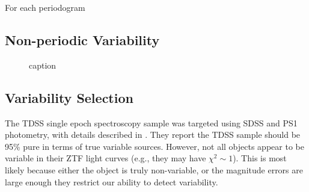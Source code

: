 \documentclass[twocolumn, tighten, astrosymb]{aastex631}
\begin{document}
For each periodogram



\subsection{Non-periodic Variability} \label{subsec:aperiodic}



\begin{figure*}
\centering
\caption{caption}
\label{fig:Xsigma}
\end{figure*}

\subsection{Variability Selection}\label{subsec:var_selection}

The TDSS single epoch spectroscopy sample was targeted using SDSS and PS1 photometry, with details described in \citet{Morganson2015}. They report the TDSS sample should be 95\% pure in terms of true variable sources. However, not all objects appear to be variable in their ZTF light curves (e.g., they may have $\chi^2 \sim 1$). This is most likely because either the object is truly non-variable, or the magnitude errors are large enough they restrict our ability to detect variability.  
\end{document}
